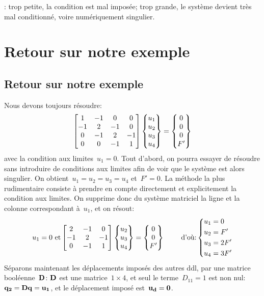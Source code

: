 \medskip
{}: trop petite, la condition est mal imposée; 
trop grande, le système devient très mal conditionné, voire numériquement singulier.

\medskip
\ifVersionAvecExemplesSepares
  \section{Retour sur notre exemple}
\else
  \subsection{Retour sur notre exemple}
\fi
Nous devons toujours résoudre:
\begin{equation}
\MM*{1 & -1 & 0 & 0 \\ -1 & 2 & -1 & 0 \\ 0 & -1 & 2 & -1\\ 0&0&-1&1}
\VV*{u_1\\u_2\\u_3\\u_4}
=
\VV*{0\\0\\0\\F'}
\end{equation}
avec la condition aux limites~$u_1=0$.
\medskipvm
Tout d'abord, on pourra essayer de résoudre sans introduire de conditions aux limites afin de voir que le système est alors singulier. On obtient~$u_1=u_2=u_3=u_4$ et~$F'=0$.
\medskipvm
La méthode la plus rudimentaire consiste à prendre en compte directement et explicitement la condition aux limites.
On supprime donc du système matriciel la ligne et la colonne correspondant à~$u_1$, et on résout:
\begin{equation}\label{Eq-Base}
u_1=0 \text{ et}
\MM*{2 & -1 & 0 \\ -1 & 2 & -1\\ 0&-1&1}
\VV*{u_2\\u_3\\u_4}
=
\VV*{0\\0\\F'}
\qquad \text{ d'où:} 
\left\{\begin{aligned} &u_1=0 \\ &u_2=F' \\ &u_3=2F' \\ &u_4=3F' \end{aligned}\right.
\end{equation}
\medskipvm
Séparons maintenant les déplacements imposés des autres ddl, par une matrice booléenne~$\MM{D}$:
$\MM{D}$ est une matrice~$1\times 4$, et seul le terme~$D_{11}=1$ est non nul:~$\VV{q_2}=\MM{D}\VV{q}=\VV{u_1}$,
et le déplacement imposé est~$\VV{u_d}=\VV{0}$.

